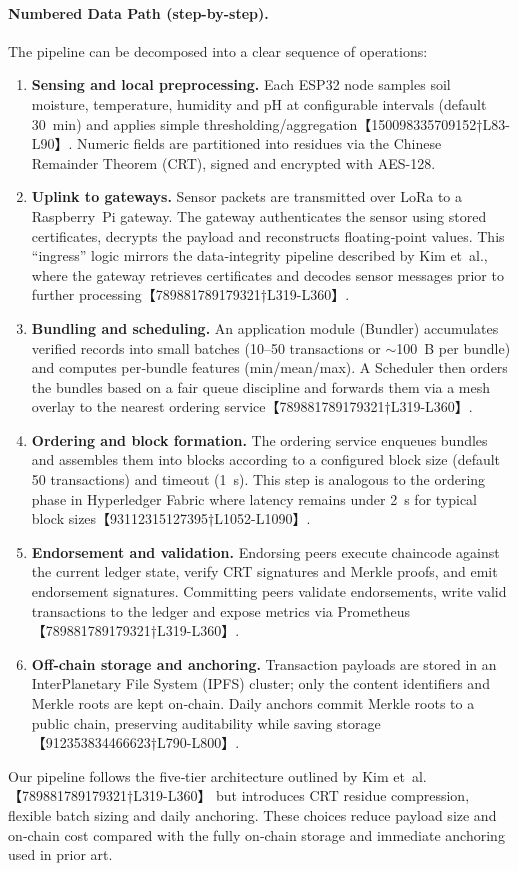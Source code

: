 \paragraph{Numbered Data Path (step-by-step).}
The pipeline can be decomposed into a clear sequence of operations:
\begin{enumerate}
  \item \textbf{Sensing and local preprocessing.}  Each ESP32 node samples soil moisture, temperature, humidity and pH at configurable intervals (default 30~min) and applies simple thresholding/aggregation【150098335709152†L83-L90】.  Numeric fields are partitioned into residues via the Chinese Remainder Theorem (CRT), signed and encrypted with AES-128.
  \item \textbf{Uplink to gateways.}  Sensor packets are transmitted over LoRa to a Raspberry~Pi gateway.  The gateway authenticates the sensor using stored certificates, decrypts the payload and reconstructs floating‑point values.  This ``ingress'' logic mirrors the data‑integrity pipeline described by Kim et~al., where the gateway retrieves certificates and decodes sensor messages prior to further processing【789881789179321†L319-L360】.
  \item \textbf{Bundling and scheduling.}  An application module (Bundler) accumulates verified records into small batches (10--50 transactions or $\sim$100~B per bundle) and computes per‑bundle features (min/mean/max).  A Scheduler then orders the bundles based on a fair queue discipline and forwards them via a mesh overlay to the nearest ordering service【789881789179321†L319-L360】.
  \item \textbf{Ordering and block formation.}  The ordering service enqueues bundles and assembles them into blocks according to a configured block size (default 50 transactions) and timeout (1~s).  This step is analogous to the ordering phase in Hyperledger Fabric where latency remains under 2~s for typical block sizes【93112315127395†L1052-L1090】.
  \item \textbf{Endorsement and validation.}  Endorsing peers execute chaincode against the current ledger state, verify CRT signatures and Merkle proofs, and emit endorsement signatures.  Committing peers validate endorsements, write valid transactions to the ledger and expose metrics via Prometheus【789881789179321†L319-L360】.
  \item \textbf{Off‑chain storage and anchoring.}  Transaction payloads are stored in an InterPlanetary File System (IPFS) cluster; only the content identifiers and Merkle roots are kept on‑chain.  Daily anchors commit Merkle roots to a public chain, preserving auditability while saving storage【912353834466623†L790-L800】.
\end{enumerate}
Our pipeline follows the five‑tier architecture outlined by Kim et~al.【789881789179321†L319-L360】 but introduces CRT residue compression, flexible batch sizing and daily anchoring.  These choices reduce payload size and on‑chain cost compared with the fully on‑chain storage and immediate anchoring used in prior art.

